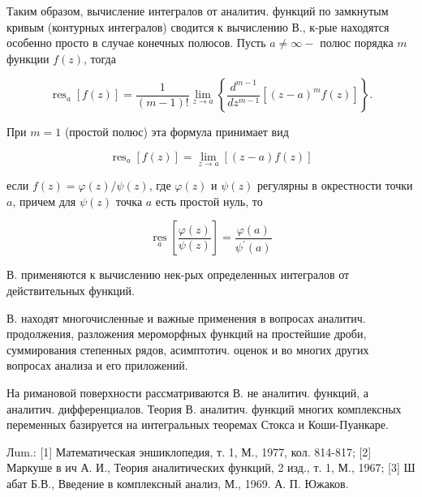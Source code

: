 \documentclass[10pt]{article}
\begin{document}
Таким образом, вычисление интегралов от аналитич. функций по замкнутым кривым (контурных интегралов) сводится к вычислению В., к-рые находятся особенно просто в случае конечных полюсов. Пусть $a \neq \infty-$ полюс порядка $m$ функции $f(z)$, тогда



\[

\operatorname{res}_{a}[f(z)]=\frac{1}{(m-1) !} \lim _{z \rightarrow a}\left\{\frac{d^{m-1}}{d z^{m-1}}\left[(z-a)^{m} f(z)\right]\right\} .

\]



При $m=1$ (простой полюс) эта формула принимает вид



\[

\operatorname{res}_{a}[f(z)]=\lim _{z \rightarrow a}[(z-a) f(z)]

\]



если $f(z)=\varphi(z) / \psi(z)$, где $\varphi(z)$ и $\psi(z)$ регулярны в окрестности точки $a$, причем для $\psi(z)$ точка $a$ есть простой нуль, то



\[

\underset{a}{\operatorname{res}}\left[\frac{\varphi(z)}{\psi(z)}\right]=\frac{\varphi(a)}{\psi^{\prime}(a)}

\]



В. применяются к вычислению нек-рых определенных интегралов от действительных функций.



В. находят многочисленные и важные применения в вопросах аналитич. продолжения, разложения мероморфных функций на простейшие дроби, суммирования степенных рядов, асимптотич. оценок и во многих других вопросах анализа и его приложений.



На римановой поверхности рассматриваются В. не аналитич. функций, а аналитич. дифференциалов. Теория В. аналитич. функций многих комплексных переменных базируется на интегральных теоремах Стокса и Коши-Пуанкаре.



Лum.: [1] Математическая эншиклопедия, т. 1, М., 1977, кол. 814-817; [2] Маркуше в ич А. И., Теория аналитических функций, 2 изд., т. 1, М., 1967; [3] Ш абат Б.В., Введение в комплексный анализ, М., 1969. А. П. Южаков.
\end{document}
